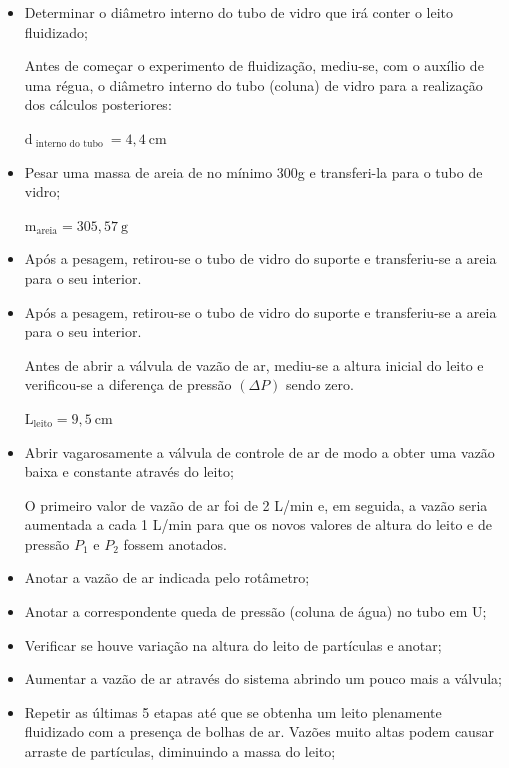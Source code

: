 \begin{itemize}
\item Determinar o diâmetro interno do tubo de vidro que irá conter o leito fluidizado; 

Antes de começar o experimento de fluidização, mediu-se, com o auxílio de uma régua, o diâmetro interno do tubo (coluna) de vidro para a realização dos cálculos posteriores:

$\mathrm{d}_{\text { interno do tubo }}=4,4 \ \mathrm{cm}$

\item Pesar uma massa de areia de no mínimo 300g e transferi-la para o tubo de vidro;

$\mathrm{m}_{\mathrm{areia}}=305,57 \ \mathrm{g}$

\item Após a pesagem, retirou-se o tubo de vidro do suporte e transferiu-se a areia para o seu interior. 

\item Após a pesagem, retirou-se o tubo de vidro do suporte e transferiu-se a areia para o seu interior. 

Antes de abrir a válvula de vazão de ar, mediu-se a altura inicial do leito e verificou-se a diferença de pressão $ (\Delta P) $ sendo zero.

$\mathrm{L}_{\mathrm{leito}}=9,5 \ \mathrm{cm}$

\item Abrir vagarosamente a válvula de controle de ar de modo a obter uma vazão baixa e constante através do leito;

O primeiro valor de vazão de ar foi de 2 L/min e, em seguida, a vazão seria aumentada a cada 1 L/min para que os novos valores de altura do leito e de pressão $ P_{1} $ e $P_{2}$ fossem anotados.

\item Anotar a vazão de ar indicada pelo rotâmetro;

\item Anotar a correspondente queda de pressão (coluna de água) no tubo em U;

\item Verificar se houve variação na altura do leito de partículas e anotar;

\item Aumentar a vazão de ar através do sistema abrindo um pouco mais a válvula;


\item Repetir as últimas 5 etapas até que se obtenha um leito plenamente fluidizado com a presença de bolhas de ar. Vazões muito altas podem causar arraste de partículas, diminuindo a massa do leito;


\end{itemize}
